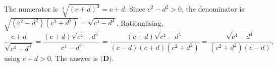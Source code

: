 The numerator is $\sqrt[3]{(c+d)^3}=c+d$. Since $c^2-d^2>0$, the denominator is $\sqrt{(c^2-d^2)(c^2+d^2)}=\sqrt{c^4-d^4}$. Rationalising,
\[
\dfrac{c+d}{\sqrt{c^4-d^4}}=\dfrac{(c+d)\sqrt{c^4-d^4}}{c^4-d^4}=\dfrac{(c+d)\sqrt{c^4-d^4}}{(c-d)(c+d)(c^2+d^2)}=\dfrac{\sqrt{c^4-d^4}}{(c^2+d^2)(c-d)} ,
\]
using $c+d>0$. The answer is $\boxed{\textbf{(D)}}$.
